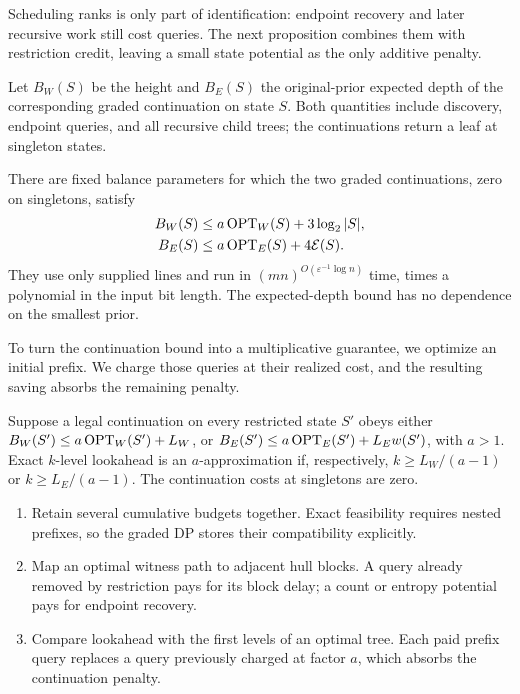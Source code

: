 Scheduling ranks is only part of identification: endpoint recovery
and later recursive work still cost queries. The next proposition
combines them with restriction credit, leaving a small state potential
as the only additive penalty.

Let $B_W(S)$ be the height and $B_E(S)$ the original-prior expected
depth of the corresponding graded continuation on state $S$. Both
quantities include discovery, endpoint queries, and all recursive child
trees; the continuations return a leaf at singleton states.

\begin{proposition}
\label{prop:qp-baselines}
There are fixed balance parameters for which the two graded
continuations, zero on singletons, satisfy
\begin{align}
 B_W(S)&\le a\operatorname{OPT}_W(S)+3\log_2|S|,
       \label{eq:qp-max-induction}\\
 B_E(S)&\le a\operatorname{OPT}_E(S)+4\mathcal E(S).
       \label{eq:qp-expected-ratio}
\end{align}
They use only supplied lines and run in
$(mn)^{O(\varepsilon^{-1}\log n)}$ time, times a polynomial in the
input bit length. The expected-depth bound has no dependence on the
smallest prior.
\end{proposition}

To turn the continuation bound into a multiplicative guarantee, we
optimize an initial prefix. We charge those queries at their realized
cost, and the resulting saving absorbs the remaining penalty.

\begin{proposition}
\label{lem:lookahead-completion}
Suppose a legal continuation on every restricted state $S'$ obeys
either $B_W(S')\le a\operatorname{OPT}_W(S')+L_W$, or
$B_E(S')\le a\operatorname{OPT}_E(S')+L_Ew(S')$, with $a>1$.
Exact $k$-level lookahead is an $a$-approximation if, respectively,
$k\ge L_W/(a-1)$ or $k\ge L_E/(a-1)$.
The continuation costs at singletons are zero.
\end{proposition}




\begin{proofstrategy}
\begin{enumerate}
\item Retain several cumulative budgets together. Exact feasibility
      requires nested prefixes, so the graded DP stores their
      compatibility explicitly.
\item Map an optimal witness path to adjacent hull blocks. A query
      already removed by restriction pays for its block delay; a
      count or entropy potential pays for endpoint recovery.
\item Compare lookahead with the first levels of an optimal tree.
      Each paid prefix query replaces a query previously charged at
      factor $a$, which absorbs the continuation penalty.
\end{enumerate}
\end{proofstrategy}


